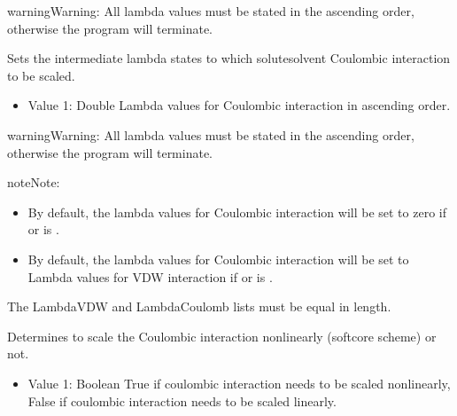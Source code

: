 \documentclass[letterpaper,10pt,english]{sphinxmanual}
\begin{document}
\begin{description}
\begin{description}
\begin{itemize}
\end{itemize}

\begin{sphinxadmonition}{warning}{Warning:}
\sphinxAtStartPar
All lambda values must be stated in the ascending order, otherwise the program will terminate.
\end{sphinxadmonition}

\item[{\sphinxcode{\sphinxupquote{LambdaCoulomb}}}] \leavevmode
\sphinxAtStartPar
Sets the intermediate lambda states to which solute\sphinxhyphen{}solvent Coulombic interaction to be scaled.
\begin{itemize}
\item {} 
\sphinxAtStartPar
Value 1: Double \sphinxhyphen{} Lambda values for Coulombic interaction in ascending order.

\end{itemize}

\begin{sphinxadmonition}{warning}{Warning:}
\sphinxAtStartPar
All lambda values must be stated in the ascending order, otherwise the program will terminate.
\end{sphinxadmonition}

\begin{sphinxadmonition}{note}{Note:}\begin{itemize}
\item {} 
\sphinxAtStartPar
By default, the lambda values for Coulombic interaction will be set to zero if  or  is .

\item {} 
\sphinxAtStartPar
By default, the lambda values for Coulombic interaction will be set to Lambda values for VDW interaction if  or  is .

\end{itemize}

\sphinxAtStartPar
\sphinxhyphen{}The LambdaVDW and LambdaCoulomb lists must be equal in length.
\end{sphinxadmonition}

\item[{\sphinxcode{\sphinxupquote{ScaleCoulomb}}}] \leavevmode
\sphinxAtStartPar
Determines to scale the Coulombic interaction non\sphinxhyphen{}linearly (soft\sphinxhyphen{}core scheme) or not.
\begin{itemize}
\item {} 
\sphinxAtStartPar
Value 1: Boolean \sphinxhyphen{} True if coulombic interaction needs to be scaled non\sphinxhyphen{}linearly, False if coulombic interaction needs to be scaled linearly.


\end{itemize}
\end{description}
\end{description}
\end{document}
